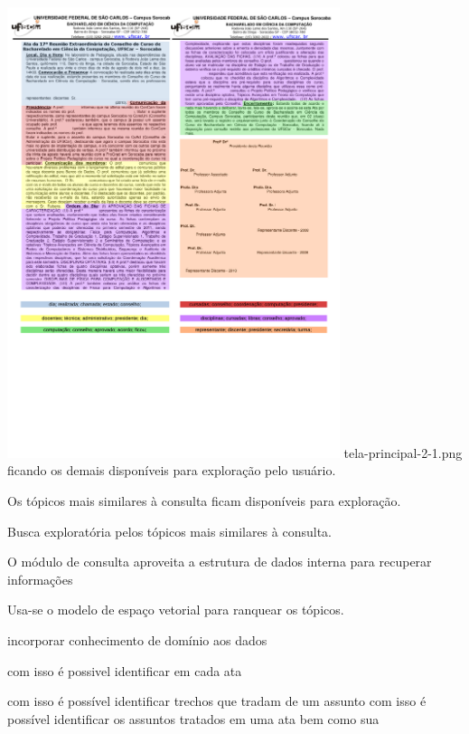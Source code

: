 		\includegraphics[trim={ 0 235 0 16 },clip,page=1,width=0.73\textwidth]{images/distribuicao.pdf}
tela-principal-2-1.png
ficando os demais disponíveis para exploração pelo usuário.

Os tópicos mais similares à consulta ficam disponíveis para exploração.


Busca exploratória pelos tópicos mais similares à consulta.







O módulo de consulta aproveita a estrutura de dados interna para recuperar informações

Usa-se o modelo de espaço vetorial para ranquear os tópicos.








incorporar conhecimento de domínio aos dados












com isso é possivel identificar em cada ata

com isso é possível identificar trechos que tradam de um assunto
com isso é possível identificar os assuntos tratados em uma ata bem como sua 

